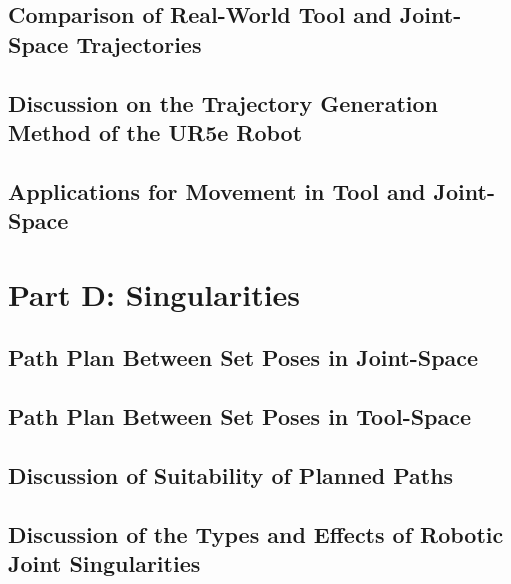 \documentclass[fleqn]{article}
\begin{document}
\subsection{Comparison of Real-World Tool and Joint-Space Trajectories}

\subsection{Discussion on the Trajectory Generation Method of the UR5e Robot}

\subsection{Applications for Movement in Tool and Joint-Space}

\section{Part D: Singularities}
\subsection{Path Plan Between Set Poses in Joint-Space}

\subsection{Path Plan Between Set Poses in Tool-Space}

\subsection{Discussion of Suitability of Planned Paths}

\subsection{Discussion of the Types and Effects of Robotic Joint Singularities}
\end{document}
